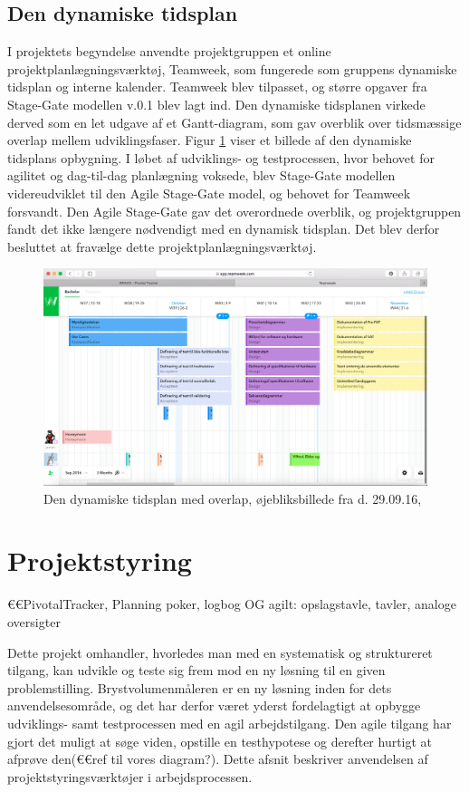 \subsection{Den dynamiske tidsplan} 
I projektets begyndelse anvendte projektgruppen et online projektplanlægningsværktøj, Teamweek, som fungerede som gruppens dynamiske tidsplan og interne kalender. Teamweek blev tilpasset, og større opgaver fra Stage-Gate modellen v.0.1 blev lagt ind. Den dynamiske tidsplanen virkede derved som en let udgave af et Gantt-diagram, som gav overblik over tidsmæssige overlap mellem udviklingsfaser. Figur \ref{fig:teamweek} viser et billede af den dynamiske tidsplans opbygning. I løbet af udviklings- og testprocessen, hvor behovet for agilitet og dag-til-dag planlægning voksede, blev Stage-Gate modellen videreudviklet til den Agile Stage-Gate model, og behovet for Teamweek forsvandt. Den Agile Stage-Gate gav det overordnede overblik, og projektgruppen fandt det ikke længere nødvendigt med en dynamisk tidsplan. Det blev derfor besluttet at fravælge dette projektplanlægningsværktøj.  

\begin{figure}[htb]
\centering
\includegraphics[width=5in]{teamweek.png}	
\caption{Den dynamiske tidsplan med overlap, øjebliksbillede fra d. 29.09.16,}
\label{fig:teamweek}
\end{figure}

\section{Projektstyring}
	€€PivotalTracker, Planning poker, logbog OG agilt: opslagstavle, tavler, analoge oversigter
	
	Dette projekt omhandler, hvorledes man med en systematisk og struktureret tilgang, kan udvikle og teste sig frem mod en ny løsning til en given problemstilling. Brystvolumenmåleren er en ny løsning inden for dets anvendelsesområde, og det har derfor været yderst fordelagtigt at opbygge udviklings- samt testprocessen med en agil arbejdstilgang. Den agile tilgang har gjort det muligt at søge viden, opstille en testhypotese og derefter hurtigt at afprøve den(€€ref til vores diagram?). Dette afsnit beskriver anvendelsen af projektstyringsværktøjer i arbejdsprocessen. 
	

